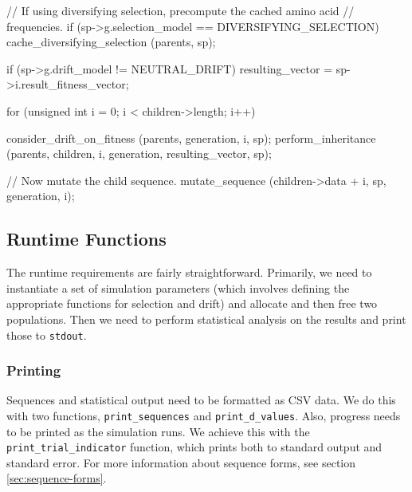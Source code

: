 \documentclass{article}
\begin{document}
\begin{ccode}
{  // If using diversifying selection, precompute the cached amino acid
  // frequencies.
  if (sp->g.selection_model == DIVERSIFYING_SELECTION)
    cache_diversifying_selection (parents, sp);

  if (sp->g.drift_model != NEUTRAL_DRIFT)
    resulting_vector = sp->i.result_fitness_vector;

  for (unsigned int i = 0; i < children->length; i++) {
    consider_drift_on_fitness (parents, generation, i, sp);
    perform_inheritance (parents, children, i, generation, resulting_vector, sp);

    // Now mutate the child sequence.
    mutate_sequence (children->data + i, sp, generation, i);
  }
}
\end{ccode}

    \subsection{Runtime Functions}

      The runtime requirements are fairly straightforward. Primarily, we need to
      instantiate a set of simulation parameters (which involves defining the
      appropriate functions for selection and drift) and allocate and then free
      two populations. Then we need to perform statistical analysis on the
      results and print those to \verb|stdout|.

      \subsubsection{Printing}

	Sequences and statistical output need to be formatted as CSV data. We do
	this with two functions, \verb|print_sequences| and
	\verb|print_d_values|. Also, progress needs to be printed as the
	simulation runs. We achieve this with the \verb|print_trial_indicator|
	function, which prints both to standard output and standard error. For
	more information about sequence forms, see section
	\ref{sec:sequence-forms}.
\end{document}
